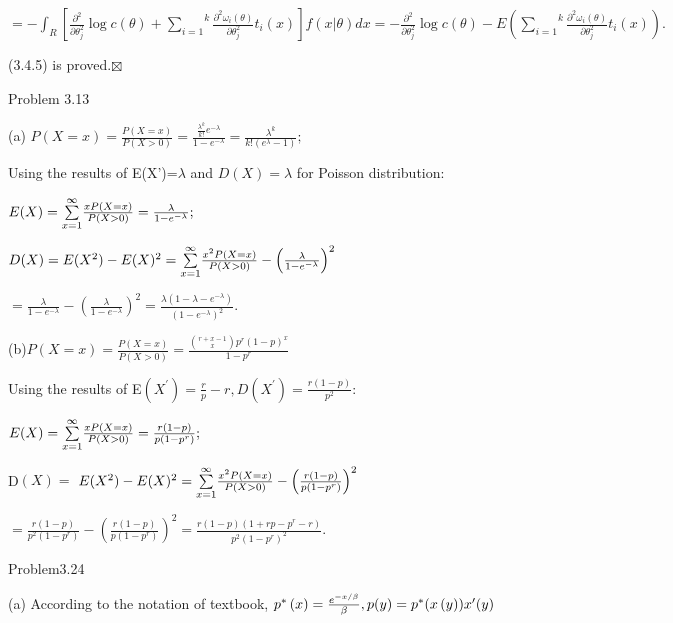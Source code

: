 \documentclass{article}
\begin{document}
$=-\int_{R}\left[ \frac{\partial ^{2}}{\partial \theta _{j}^{2}}\log c\left(
\theta \right) +\overset{k}{\underset{i=1}{\sum }}\frac{\partial ^{2}\omega
_{i}(\theta )}{\partial \theta _{j}^{2}}t_{i}(x)\right] f(x|\theta )dx=-%
\frac{\partial ^{2}}{\partial \theta _{j}^{2}}\log c\left( \theta \right)
-E\left( \overset{k}{\underset{i=1}{\sum }}\frac{\partial ^{2}\omega
_{i}(\theta )}{\partial \theta _{j}^{2}}t_{i}(x)\right) .$

(3.4.5) is proved.$\boxtimes $

Problem 3.13

(a) $P(X=x)=\frac{P(X=x)}{P(X>0)}=\frac{\frac{\lambda ^{k}}{k!}e^{-\lambda }%
}{1-e^{-\lambda }}=\frac{\lambda ^{k}}{k!\left( e^{\lambda }-1\right) };$

Using the results of E(X')=$\lambda $ and $D(X)=\lambda $ for Poisson
distribution:

$E(X)=\overset{\infty }{\underset{x=1}{\sum }}\frac{xP(X=x)}{P(X>0)}=\frac{%
\lambda }{1-e^{-\lambda }};$

$D(X)=E(X^{2})-E(X)^{2}=\overset{\infty }{\underset{x=1}{\sum }}\frac{%
x^{2}P(X=x)}{P(X>0)}-\left( \frac{\lambda }{1-e^{-\lambda }}\right) ^{2}$

$=\frac{\lambda }{1-e^{-\lambda }}-\left( \frac{\lambda }{1-e^{-\lambda }}%
\right) ^{2}=\frac{\lambda \left( 1-\lambda -e^{-\lambda }\right) }{\left(
1-e^{-\lambda }\right) ^{2}}.$

(b)$P(X=x)=\frac{P(X=x)}{P(X>0)}=\frac{\binom{r+x-1}{x}p^{r}\left(
1-p\right) ^{x}}{1-p^{r}}$

Using the results of E$\left( X^{\prime }\right) =\frac{r}{p}-r,D(X^{\prime
})=\frac{r(1-p)}{p^{2}}:$

$E(X)=\overset{\infty }{\underset{x=1}{\sum }}\frac{xP(X=x)}{P(X>0)}=\frac{%
r\left( 1-p\right) }{p\left( 1-p^{r}\right) };$

D$\left( X\right) =$ $E(X^{2})-E(X)^{2}=\overset{\infty }{\underset{x=1}{%
\sum }}\frac{x^{2}P(X=x)}{P(X>0)}-\left( \frac{r\left( 1-p\right) }{p\left(
1-p^{r}\right) }\right) ^{2}$

$=\frac{r(1-p)}{p^{2}\left( 1-p^{r}\right) }-\left( \frac{r\left( 1-p\right) 
}{p\left( 1-p^{r}\right) }\right) ^{2}=\frac{r\left( 1-p\right) \left(
1+rp-p^{r}-r\right) }{p^{2}\left( 1-p^{r}\right) ^{2}}.$

Problem3.24

(a) According to the notation of textbook, $p^{\ast }\left( x\right) =\frac{%
e^{-x/\beta }}{\beta },p(y)=p^{\ast }(x\left( y\right) )x^{\prime }(y)$
\end{document}
